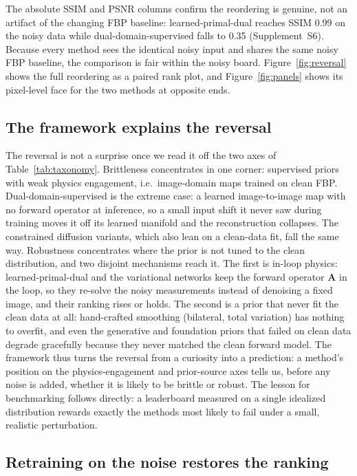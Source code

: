 \documentclass[AMA,twocolumn]{USG} %
\begin{document}
The absolute SSIM and PSNR columns confirm the reordering is genuine, not an artifact of the changing FBP baseline: learned-primal-dual reaches SSIM 0.99 on the noisy data while dual-domain-supervised falls to 0.35 (Supplement~S6). Because every method sees the identical noisy input and shares the same noisy FBP baseline, the comparison is fair within the noisy board. Figure~\ref{fig:reversal} shows the full reordering as a paired rank plot, and Figure~\ref{fig:panels} shows its pixel-level face for the two methods at opposite ends.

\subsection{The framework explains the reversal}\label{sec:explain}

The reversal is not a surprise once we read it off the two axes of Table~\ref{tab:taxonomy}. Brittleness concentrates in one corner: supervised priors with weak physics engagement, i.e.\ image-domain maps trained on clean FBP. Dual-domain-supervised is the extreme case: a learned image-to-image map with no forward operator at inference, so a small input shift it never saw during training moves it off its learned manifold and the reconstruction collapses. The constrained diffusion variants, which also lean on a clean-data fit, fall the same way. Robustness concentrates where the prior is not tuned to the clean distribution, and two disjoint mechanisms reach it. The first is in-loop physics: learned-primal-dual and the variational networks keep the forward operator $\mathbf{A}$ in the loop, so they re-solve the noisy measurements instead of denoising a fixed image, and their ranking rises or holds. The second is a prior that never fit the clean data at all: hand-crafted smoothing (bilateral, total variation) has nothing to overfit, and even the generative and foundation priors that failed on clean data degrade gracefully because they never matched the clean forward model. The framework thus turns the reversal from a curiosity into a prediction: a method's position on the physics-engagement and prior-source axes tells us, before any noise is added, whether it is likely to be brittle or robust. The lesson for benchmarking follows directly: a leaderboard measured on a single idealized distribution rewards exactly the methods most likely to fail under a small, realistic perturbation.

\subsection{Retraining on the noise restores the ranking}\label{sec:retrain}
\end{document}
